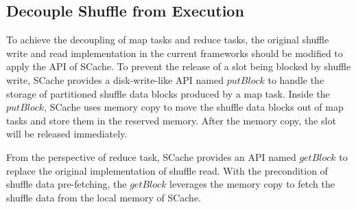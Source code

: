 \subsection{Decouple Shuffle from Execution}
To achieve the decoupling of map tasks and reduce tasks, the original shuffle write and read implementation in the current frameworks should be modified to apply the API of SCache.
To prevent the release of a slot being blocked by shuffle write,  
SCache provides a disk-write-like API named $putBlock$ to handle the storage of partitioned shuffle data blocks produced by a map task.
Inside the $putBlock$, SCache uses memory copy to move the shuffle data blocks out of map tasks and store them in the reserved memory.
After the memory copy, the slot will be released immediately.

From the perspective of reduce task, SCache provides an API named $getBlock$ to replace the original implementation of shuffle read. 
With the precondition of shuffle data pre-fetching, 
the $getBlock$ leverages the memory copy to fetch the shuffle data from the local memory of SCache.
